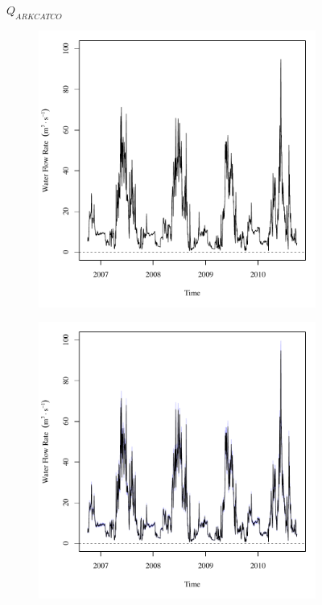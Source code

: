 \begin{linenumbers}
\subfiguretop
\begin{landscape}
	\begin{figure}
		\centering
		$ Q_{ARKCATCO} $
		\begin{subfigure}{0.7\textwidth}
			\centering
			\includegraphics[width=\textwidth]{"Figures/Results_USR/Deterministic/Q U163"}
		\end{subfigure}%
		\begin{subfigure}{0.7\textwidth}
			\centering
			\includegraphics[width=\textwidth]{"Figures/Results_USR/Stochastic/Q U163"}

\end{subfigure}
\end{figure}
\end{landscape}
\end{linenumbers}
